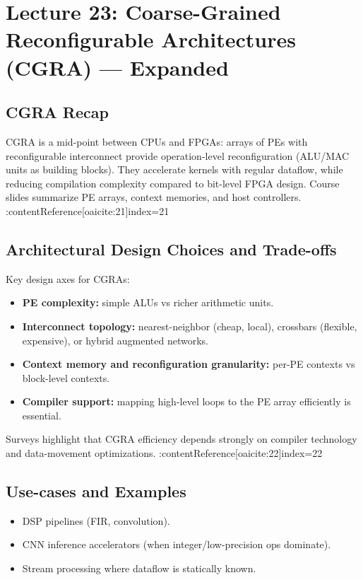 \documentclass[11pt]{article}
\begin{document}
\newpage

\section{Lecture 23: Coarse-Grained Reconfigurable Architectures (CGRA) — Expanded}

\subsection{CGRA Recap}
CGRA is a mid-point between CPUs and FPGAs: arrays of PEs with reconfigurable interconnect provide operation-level reconfiguration (ALU/MAC units as building blocks). They accelerate kernels with regular dataflow, while reducing compilation complexity compared to bit-level FPGA design. Course slides summarize PE arrays, context memories, and host controllers. :contentReference[oaicite:21]{index=21}

\subsection{Architectural Design Choices and Trade-offs}
Key design axes for CGRAs:
\begin{itemize}
  \item \textbf{PE complexity:} simple ALUs vs richer arithmetic units.
  \item \textbf{Interconnect topology:} nearest-neighbor (cheap, local), crossbars (flexible, expensive), or hybrid augmented networks.
  \item \textbf{Context memory and reconfiguration granularity:} per-PE contexts vs block-level contexts.
  \item \textbf{Compiler support:} mapping high-level loops to the PE array efficiently is essential.
\end{itemize}
Surveys highlight that CGRA efficiency depends strongly on compiler technology and data-movement optimizations. :contentReference[oaicite:22]{index=22}

\subsection{Use-cases and Examples}
\begin{itemize}
  \item DSP pipelines (FIR, convolution).
  \item CNN inference accelerators (when integer/low-precision ops dominate).
  \item Stream processing where dataflow is statically known.
\end{itemize}
\end{document}

